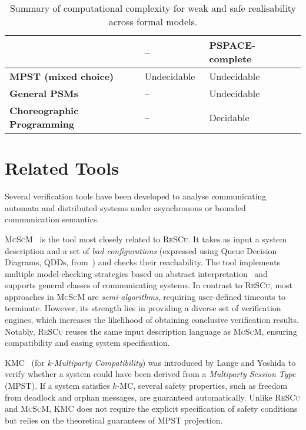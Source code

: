 \begin{table}[!ht]
\begin{tabular}{|p{4.3cm}|p{4.3cm}|p{4.3cm}|}
& --
& PSPACE-complete~\cite{stutz2024implementability} \\ 
\hline
\textbf{MPST (mixed choice)} 
& Undecidable~\cite{stutz2024implementability} 
& Undecidable~\cite{stutz2024implementability} \\ 
\hline
\textbf{General PSMs} 
& --
& Undecidable~\cite{stutz2025automata} \\ 
\hline
\textbf{Choreographic Programming} 
& --
& Decidable~\cite{barbanera2020choreography} \\ 
\hline
\end{tabular}
\caption{Summary of computational complexity for weak and safe realisability across formal models.}
\label{tab:realisability-summary}
\end{table}

\section{Related Tools}\label{sec:reltool}
Several verification tools have been developed to analyse communicating 
automata and distributed systems under asynchronous or bounded communication 
semantics. 

\textsc{McScM}~\cite{heussner2012mcscm} is the tool most closely related 
to \textsc{ReSCu}. It takes as input a system description and a set of 
\emph{bad configurations} (expressed using Queue Decision Diagrams, QDDs, 
from~\cite{boigelot1996symbolic}) and checks their reachability. 
The tool implements multiple model-checking strategies based on abstract 
interpretation~\cite{cousot1977abstract} and supports general classes of communicating systems.  
In contrast to \textsc{ReSCu}, most approaches in \textsc{McScM} are 
\emph{semi-algorithms}, requiring user-defined timeouts to terminate.  
However, its strength lies in providing a diverse set of verification 
engines, which increases the likelihood of obtaining conclusive verification 
results.  
Notably, \textsc{ReSCu} reuses the same input description language as 
\textsc{McScM}, ensuring compatibility and easing system specification.

\textsc{KMC}~\cite{lange2019verifying} (for \emph{k-Multiparty 
Compatibility}) was introduced by Lange and Yoshida to verify whether a 
system could have been derived from a \emph{Multiparty Session Type} (MPST).  
If a system satisfies $k$-MC, several safety properties, such as freedom from 
deadlock and orphan messages, are guaranteed automatically.  
Unlike \textsc{ReSCu} and \textsc{McScM}, \textsc{KMC} does not require the 
explicit specification of safety conditions but relies on the theoretical 
guarantees of MPST projection.

